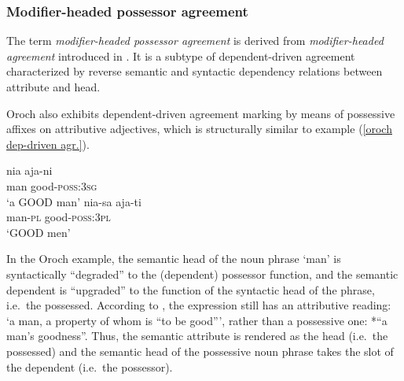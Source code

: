 \subsubsection{Modifier\hyp{}headed possessor agreement} \label{ModheadAgr}
The term \emph{modifier\hyp{}headed possessor agreement} is derived from \emph{modifier\hyp{}headed agreement} introduced in \citet{AUTOTYP-NP}. It is a subtype of dependent\hyp{}driven agreement characterized by reverse semantic and syntactic dependency relations between attribute and head. 

Oroch also exhibits dependent\hyp{}driven agreement marking by means of possessive affixes on attributive adjectives, which is structurally similar to example (\ref{oroch dep-driven agr.}).
\begin{exe}
\ex
\label{oroch mod-headed agr}
\begin{xlist}
\ex
\gll 	nia	aja-ni\\
	man	good-\textsc{poss:3sg}\\
\glt	‘a GOOD man’
\ex 
\gll nia-sa aja-ti\\	
	man-\textsc{pl} good-\textsc{poss:3pl}\\
\glt	‘GOOD men’
\end{xlist}
\end{exe}
In the Oroch example, the semantic head of the noun phrase ‘man’ is syntactically “degraded” to the (dependent) possessor function, and the semantic dependent is “upgraded” to the function of the syntactic head of the phrase, i.e.~the possessed. According to \citet[3]{malchukov2000}, the expression still has an attributive reading: ‘a man, a property of whom is “to be good”’, rather than a possessive one: *“a man's goodness”. Thus, the semantic attribute is rendered as the head (i.e.~the possessed) and the semantic head of the possessive noun phrase takes the slot of the dependent (i.e.~the possessor).

